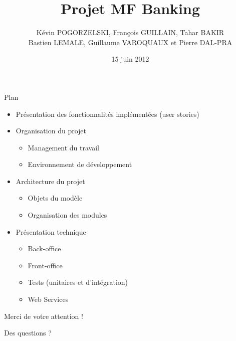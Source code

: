 \documentclass{beamer}
\title{Projet MF Banking}
\date{15 juin 2012}
\author{K\'evin POGORZELSKI, Fran\c cois GUILLAIN, Tahar BAKIR\\ Bastien LEMALE, Guillaume VAROQUAUX et Pierre DAL-PRA}
\begin{document}
\begin{frame}
	\maketitle
\end{frame}

\begin{frame}{Plan}
	\begin{itemize}
		\item Pr\'esentation des fonctionnalit\'es impl\'ement\'ees (user stories) 
		\item Organisation du projet
			\begin{itemize}
				\item Management du travail
				\item Environnement de d\'eveloppement
			\end{itemize}
		\item Architecture du projet
			\begin{itemize}
				\item Objets du mod\`ele
				\item Organisation des modules
			\end{itemize}
		\item Pr\'esentation technique
			\begin{itemize}
				\item Back-office
				\item Front-office
				\item Tests (unitaires et d'int\'egration)
				\item Web Services
			\end{itemize}
	\end{itemize}
\end{frame}






\begin{frame}
	\begin{center}
		\huge{Merci de votre attention !}		
	\end{center}
\end{frame}

\begin{frame}
	\begin{center}
		\huge{Des questions ?}		
	\end{center}
\end{frame}
\end{document}

